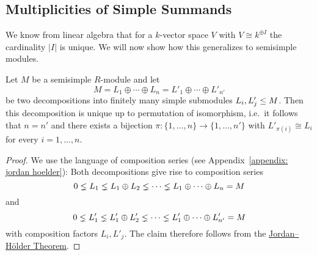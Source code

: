 \subsection{Multiplicities of Simple Summands}
\label{subsection: multiplicity of simple summands}


\begin{fluff}
  We know from linear algebra that for a $k$-vector space $V$ with $V \cong k^{\oplus I}$ the cardinality $|I|$ is unique.
  We will now show how this generalizes to semisimple modules.
\end{fluff}


\begin{lemma}
  \label{lemma: multiplicities for finite length}
  Let $M$ be a semisimple $R$-module and let
  \[
      M
    = L_1 \oplus \dotsb \oplus L_n
    = L'_1 \oplus \dotsb \oplus L'_{n'}
  \]
  be two decompositions into finitely many simple submodules $L_i, L'_j \leq M$.
  Then this decomposition is unique up to permutation of isomorphism, i.e.\ it follows that $n = n'$ and there exists a bijection $\pi \colon \{1, \dotsc, n\} \to \{1, \dotsc, n'\}$ with $L'_{\pi(i)} \cong L_i$ for every $i = 1, \dotsc, n$.
\end{lemma}


\begin{proof}
  We use the language of composition series (see Appendix~\ref{appendix: jordan hoelder}):
  Both decompositions give rise to composition series
  \[
                0
    \lneq  L_1
    \lneq  L_1 \oplus L_2
    \lneq  \dotsb
    \lneq  L_1 \oplus \dotsb \oplus L_n
    =           M
  \]
  and
  \[
                0
    \lneq  L'_1
    \lneq  L'_1 \oplus L'_2
    \lneq  \dotsb
    \lneq  L'_1 \oplus \dotsb \oplus L'_{n'}
    =           M
  \]
  with composition factors $L_i, L'_j$.
  The claim therefore follows from the \hyperref[theorem: jordan hoelder theorem]{Jordan--Hölder Theorem}.
\end{proof}


